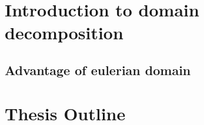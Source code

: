 
\section{Introduction to domain decomposition}


\subsection{Advantage of eulerian domain}

\section{Thesis Outline}


%
%
%
%


